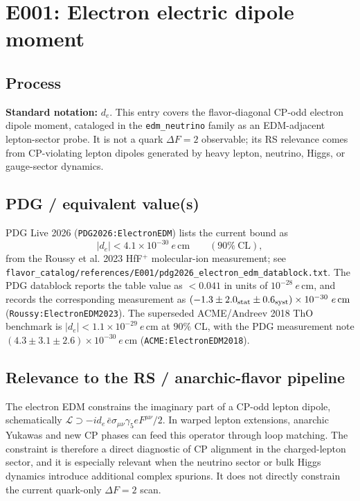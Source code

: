 
\section{E001: Electron electric dipole moment}

\subsection*{Process}
\textbf{Standard notation:} \(d_e\).  This entry covers the flavor-diagonal
CP-odd electron dipole moment, cataloged in the \texttt{edm\_neutrino} family
as an EDM-adjacent lepton-sector probe.  It is not a quark \(\Delta F=2\)
observable; its RS relevance comes from CP-violating lepton dipoles generated
by heavy lepton, neutrino, Higgs, or gauge-sector dynamics.

\subsection*{PDG / equivalent value(s)}
PDG Live 2026 (\texttt{PDG2026:ElectronEDM}) lists the current bound as
\[
  |d_e| < 4.1\times 10^{-30}\ e\,\mathrm{cm}
  \qquad (90\%~\mathrm{CL}),
\]
from the Roussy et al. 2023 HfF\({}^+\) molecular-ion measurement; see
\texttt{flavor\_catalog/references/E001/pdg2026\_electron\_edm\_datablock.txt}.
The PDG datablock reports the table value as \(<0.041\) in units of
\(10^{-28}\ e\,\mathrm{cm}\), and records the corresponding measurement as
\((-1.3\pm2.0_{\rm stat}\pm0.6_{\rm syst})\times10^{-30}\ e\,\mathrm{cm}\)
(\texttt{Roussy:ElectronEDM2023}).
The superseded ACME/Andreev 2018 ThO benchmark is
\(|d_e|<1.1\times10^{-29}\ e\,\mathrm{cm}\) at \(90\%\) CL, with the PDG
measurement note \((4.3\pm3.1\pm2.6)\times10^{-30}\ e\,\mathrm{cm}\)
(\texttt{ACME:ElectronEDM2018}).

\subsection*{Relevance to the RS / anarchic-flavor pipeline}
The electron EDM constrains the imaginary part of a CP-odd lepton dipole,
schematically \(\mathcal{L}\supset -i d_e\,\bar e\sigma_{\mu\nu}\gamma_5 e
F^{\mu\nu}/2\).  In warped lepton extensions, anarchic Yukawas and new CP
phases can feed this operator through loop matching.  The constraint is
therefore a direct diagnostic of CP alignment in the charged-lepton sector,
and it is especially relevant when the neutrino sector or bulk Higgs dynamics
introduce additional complex spurions.  It does not directly constrain the
current quark-only \(\Delta F=2\) scan.

